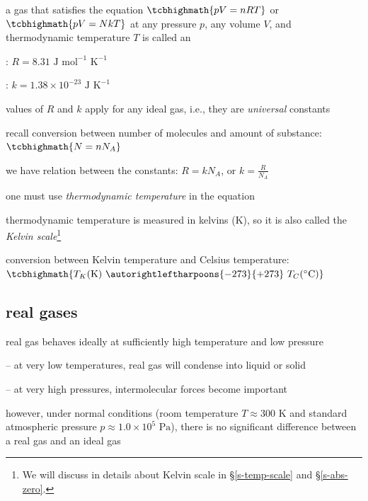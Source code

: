\rcyskip

\begin{ilight}
	a gas that satisfies the equation $\tcbhighmath{pV=nRT}$ or $\tcbhighmath{pV=NkT}$ at any pressure $p$, any volume $V$, and thermodynamic temperature $T$ is called an 
\end{ilight}

: $R=8.31 \text{ J mol}^{-1}\text{ K}^{-1}$

: $k=1.38\times10^{-23} \text{ J K}^{-1}$

values of $R$ and $k$ apply for any ideal gas, i.e., they are \emph{universal} constants

\cmt recall conversion between number of molecules and amount of substance: $\tcbhighmath{N=nN_A}$

we have relation between the constants: $R = kN_A$, or $k=\frac{R}{N_A}$

\cmt one must use \emph{thermodynamic temperature} in the equation

thermodynamic temperature is measured in kelvins (K), so it is also called the \emph{Kelvin scale}\footnote{We will discuss in details about Kelvin scale in \S\ref{s-temp-scale} and \S\ref{s-abs-zero}.}

conversion between Kelvin temperature and Celsius temperature: $\tcbhighmath{T_K (\text{K}) \text{ } \autorightleftharpoons{\footnotesize -273}{\footnotesize +273} \text{ } T_C (\OC)}$

\subsection*{real gases}

real gas behaves ideally at sufficiently high temperature and low pressure

\begin{compactitem}
	\item[--] at very low temperatures, real gas will condense into liquid or solid
	
	\item[--] at very high pressures, intermolecular forces become important
\end{compactitem}

however, under normal conditions (room temperature $T \approx 300 \text{ K}$ and standard atmospheric pressure $p \approx 1.0\times10^5 \text{ Pa}$), there is no significant difference between a real gas and an ideal gas

